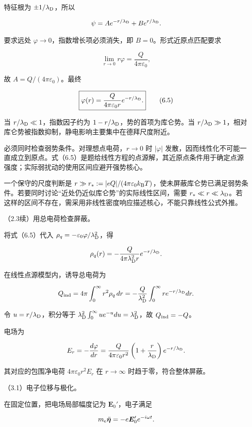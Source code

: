 \documentclass[12pt,a4paper,fontset=fandol]{ctexart}
\begin{document}
特征根为 \(\pm1/\lambda_{\rm D}\)，所以

\[
\psi=Ae^{-r/\lambda_{\rm D}}+Be^{r/\lambda_{\rm D}}.
\]

要求远处 \(\varphi\to0\)，指数增长项必须消失，即
\(B=0\)。形式近原点匹配要求

\[
\lim_{r\to0}r\varphi=\frac{Q}{4\pi\varepsilon_0},
\]

故 \(A=Q/(4\pi\varepsilon_0)\)。最终

\[
\boxed{\varphi(r)=\frac{Q}{4\pi\varepsilon_0r}e^{-r/\lambda_{\rm D}}.}
\tag{6.5}
\]

当 \(r/\lambda_{\rm D}\ll1\)，指数因子约为
\(1-r/\lambda_{\rm D}\)，势的首项为库仑势。当
\(r/\lambda_{\rm D}\gg1\)，相对库仑势被指数抑制，静电影响主要集中在德拜尺度附近。

必须同时检查弱势条件。对理想点电荷，\(r\to0\) 时 \(|\varphi|\)
发散，因而线性化不可能一直成立到原点。式（6.5）是题给线性方程的点源解，其近原点条件用于确定点源强度；实际弱扰动的使用区间应避开强势核心。

一个保守的尺度判断是
\(r\gg r_*:=|eQ|/(4\pi\varepsilon_0k_{\rm B}T)\)，使未屏蔽库仑势已满足弱势条件。若要同时讨论``近处仍近似库仑势''的实际线性区间，需要
\(r_*\ll r\ll\lambda_{\rm D}\)。若这样的区间不存在，需采用非线性密度响应描述核心，不能只靠线性公式外推。

（2.3续）用总电荷检查屏蔽。

将式（6.5）代入 \(\rho_q=-\varepsilon_0\varphi/\lambda_{\rm D}^2\)，得

\[
\rho_q(r)=-\frac{Q}{4\pi\lambda_{\rm D}^2r}e^{-r/\lambda_{\rm D}}.
\]

在线性点源模型内，诱导总电荷为

\[
Q_{\rm ind}=4\pi\int_0^\infty r^2\rho_q\,dr
=-\frac{Q}{\lambda_{\rm D}^2}\int_0^\infty re^{-r/\lambda_{\rm D}}dr.
\]

令 \(u=r/\lambda_{\rm D}\)，积分等于
\(\lambda_{\rm D}^2\int_0^\infty ue^{-u}du=\lambda_{\rm D}^2\)，故
\(Q_{\rm ind}=-Q\)。

电场为

\[
E_r=-\frac{d\varphi}{dr}
=\frac{Q}{4\pi\varepsilon_0r^2}
\left(1+\frac r{\lambda_{\rm D}}\right)e^{-r/\lambda_{\rm D}}.
\]

其对应的包围净电荷 \(4\pi\varepsilon_0r^2E_r\) 在 \(r\to\infty\)
时趋于零，符合整体屏蔽。

（3.1）电子位移与极化。

在固定位置，把电场局部幅度记为 \(\boldsymbol E_0'\)，电子满足

\[
m_{\rm e}\ddot{\boldsymbol\eta}=-e\boldsymbol E_0'e^{-i\omega t}.
\]
\end{document}
